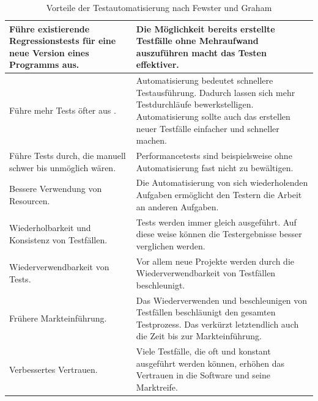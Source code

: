 \begin{table}
\begin{tabular}{p{}|p{}}
Führe existierende Regressionstests für eine neue Version eines Programms aus.
& Die Möglichkeit bereits erstellte Testfälle ohne Mehraufwand auszuführen macht das Testen effektiver. \\
\hline 
Führe mehr Tests öfter aus .
& Automatisierung bedeutet schnellere Testausführung. Dadurch lassen sich mehr Testdurchläufe bewerkstelligen. Automatisierung sollte auch das erstellen neuer Testfälle einfacher und schneller machen. \\ 
\hline 
Führe Tests durch, die manuell schwer bis unmöglich wären. & 
Performancetests sind beispielsweise ohne Automatisierung fast nicht zu bewältigen.\\ 
\hline 
Bessere Verwendung von Resourcen. & Die Automatisierung von sich wiederholenden Aufgaben ermöglicht den Testern die Arbeit an anderen Aufgaben. \\ 
\hline 
Wiederholbarkeit und Konsistenz von Testfällen. & Tests werden immer gleich ausgeführt. Auf diese weise können die Testergebnisse besser verglichen werden. \\ 
\hline 
Wiederverwendbarkeit von Tests. & Vor allem neue Projekte werden durch die Wiederverwendbarkeit von Testfällen beschleunigt. \\ 
\hline 
Frühere Markteinführung. & Das Wiederverwenden und beschleunigen von Testfällen beschläunigt den gesamten Testprozess. Das verkürzt letztendlich auch die Zeit bis zur Markteinführung. \\ 
\hline 
Verbessertes Vertrauen. & Viele Testfälle, die oft und konstant ausgeführt werden können, erhöhen das Vertrauen in die Software und seine Marktreife.\\ 

\end{tabular} 
\caption{Vorteile der Testautomatisierung nach Fewster und Graham \cite{fewster_software_1999}}
\label{tbl:vorteile_testautomatisierung}
\end{table}



